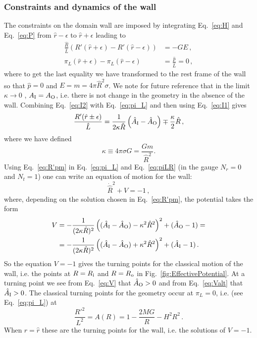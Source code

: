 \documentclass[11pt,a4paper]{article}
\begin{document}
\subsubsection*{Constraints and dynamics of the wall}
The constraints on the domain wall are imposed by integrating
Eq.~\eqref{eq:H} and Eq.~\eqref{eq:P} from $\hat{r}-\epsilon$ to $\hat{r}+\epsilon$ leading to
\begin{align}
\label{eq:I1}
\frac{\hat{R}}{\hat{L}}(R'(\hat{r}+\epsilon)-R'(\hat{r}-\epsilon)) & = -GE \,,\\
\label{eq:I2}
\pi_{L}(\hat{r}+\epsilon)-\pi_{L}(\hat{r}-\epsilon) & = \frac{\hat{p}}{\hat{L}}=0 \,,
\end{align}
where to get the last equality we have transformed to the rest frame
of the wall so that $\hat{p}=0$ and $E = m = 4 \pi \hat{R}^{2} \sigma$. We note for future reference that in the limit $\kappa\rightarrow 0$ , $A_{\rm I} = A_{\rm O}$, i.e. there is not change in the geometry in the absence of the wall.  Combining Eq.~\eqref{eq:I2} with Eq.~\eqref{eq:pi_L} and then using Eq.~\eqref{eq:I1} gives 
\begin{equation}
\label{eq:R'pm}
\frac{R'(\hat{r}\pm\epsilon)}{\hat{L}}=\frac{1}{2\kappa\hat{R}}\left(\hat{A}_{{\rm I}}-\hat{A}_{{\rm O}}\right)\mp\frac{\kappa}{2}\hat{R} \,,
\end{equation}
where we have defined 
\begin{equation}
\kappa\equiv4\pi\sigma G=\frac{Gm}{\hat{R}^{2}}.
\end{equation}
Using Eq.~\eqref{eq:R'pm} in Eq.~\eqref{eq:pi_L} and Eq.~\eqref{eq:piLR} (in the gauge $N_{r}=0$ and $N_t = 1$) one can write an equation of motion for the wall:
\begin{equation}
\label{eq:EofM}
\dot{\hat{R}}^{2}+V = -1 \,,
\end{equation}
where, depending on the solution chosen in Eq.~\eqref{eq:R'pm}, the potential takes the form
\begin{align}
\label{eq:V}
V & = -\frac{1}{(2\kappa\hat{R})^{2}}\left((\hat{A}_{{\rm I}}-\hat{A}_{{\rm O}})-\kappa^{2}\hat{R}^{2}\right)^{2}+(\hat{A}_{{\rm O}}-1) = \\
\label{eq:Valt}
 & = -\frac{1}{(2\kappa\hat{R})^{2}}\left((\hat{A}_{{\rm I}}-\hat{A}_{{\rm O}})+\kappa^{2}\hat{R}^{2}\right)^{2}+(\hat{A}_{{\rm I}}-1) \,.
\end{align}
So the equation $V=-1$ gives the turning points for the classical
motion of the wall, i.e. the points at $R = R_{\rm i}$ and $R = R_{\rm o}$ in Fig.~\ref{fig:EffectivePotential}. At a turning point we see from Eq.~\eqref{eq:V} that $\hat{A}_{{\rm O}}>0$ and from Eq.~\eqref{eq:Valt} that $\hat{A}_{{\rm I}}>0$. The classical turning points for the geometry occur at $\pi_{L}=0$, i.e. (see Eq.~\eqref{eq:pi_L}) at
\begin{equation}
\label{eq:TurningPoints}
\frac{R'^{2}}{L^{2}} = A(R) = 1-\frac{2MG}{R}-H^{2}R^{2} \,.
\end{equation}
When $r=\hat{r}$ these are the turning points for the wall, i.e.
the solutions of $V = -1$.
\end{document}
